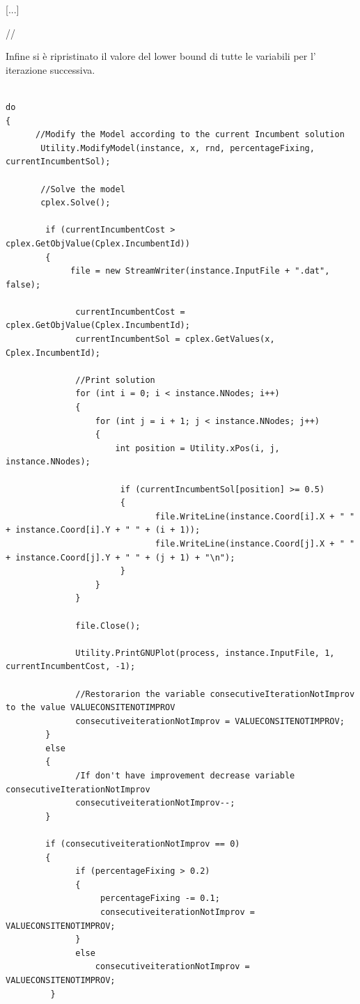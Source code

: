 \documentclass[11pt]{article}
\begin{document}
[...]

//

Infine si è ripristinato il valore del lower bound di tutte le variabili per l' iterazione successiva.

\begin{lstlisting}

do
{
      //Modify the Model according to the current Incumbent solution
       Utility.ModifyModel(instance, x, rnd, percentageFixing, currentIncumbentSol);
              
       //Solve the model
       cplex.Solve();

        if (currentIncumbentCost > cplex.GetObjValue(Cplex.IncumbentId))
        {
             file = new StreamWriter(instance.InputFile + ".dat", false);

              currentIncumbentCost = cplex.GetObjValue(Cplex.IncumbentId);
              currentIncumbentSol = cplex.GetValues(x, Cplex.IncumbentId);

              //Print solution               
              for (int i = 0; i < instance.NNodes; i++)
              {
                  for (int j = i + 1; j < instance.NNodes; j++)
                  {
                      int position = Utility.xPos(i, j, instance.NNodes);

                       if (currentIncumbentSol[position] >= 0.5)
                       {
                              file.WriteLine(instance.Coord[i].X + " " + instance.Coord[i].Y + " " + (i + 1));
                              file.WriteLine(instance.Coord[j].X + " " + instance.Coord[j].Y + " " + (j + 1) + "\n");
                       }
                  }
              }

              file.Close();

              Utility.PrintGNUPlot(process, instance.InputFile, 1, currentIncumbentCost, -1);
              
              //Restorarion the variable consecutiveIterationNotImprov to the value VALUECONSITENOTIMPROV
              consecutiveiterationNotImprov = VALUECONSITENOTIMPROV;
        }
        else
        {
              /If don't have improvement decrease variable consecutiveIterationNotImprov
              consecutiveiterationNotImprov--;
        }
                                   
        if (consecutiveiterationNotImprov == 0)
        {
              if (percentageFixing > 0.2)
              {
                   percentageFixing -= 0.1;
                   consecutiveiterationNotImprov = VALUECONSITENOTIMPROV;
              }
              else
                  consecutiveiterationNotImprov = VALUECONSITENOTIMPROV;
         }


\end{lstlisting}
\end{document}
